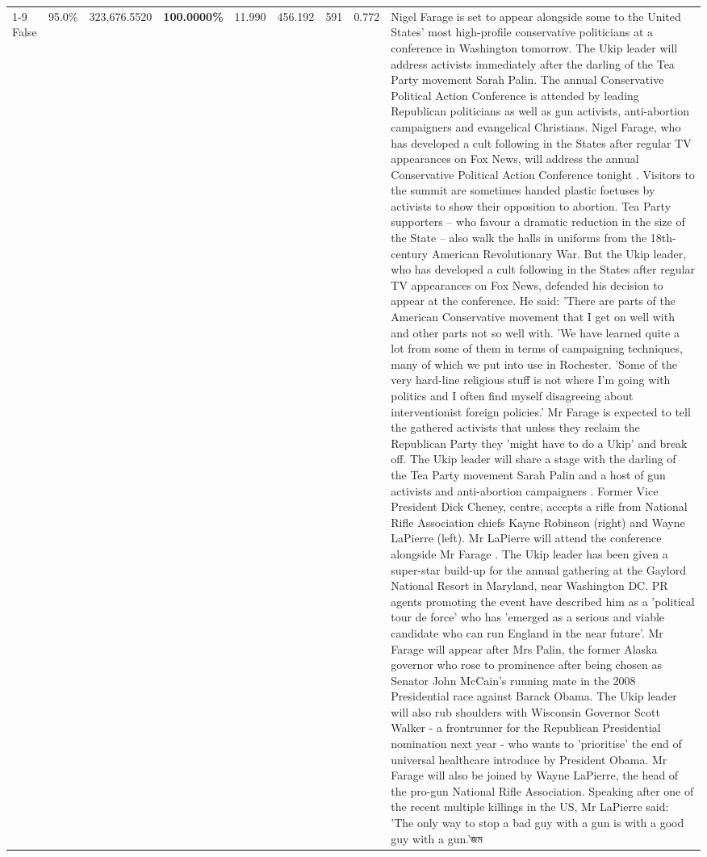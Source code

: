 \begin{table}[H]
\begin{tabular}{lllrlllll}
\cline{1-9}
False & 95.0\% & 323,676.5520 & \bfseries \color{red} 100.0000\% & 11.990 & 456.192 & 591 & 0.772 & Nigel Farage is set to appear alongside some to the United States' most high-profile conservative politicians at a conference in Washington tomorrow. The Ukip leader will address activists immediately after the darling of the Tea Party movement Sarah Palin. The annual Conservative Political Action Conference is attended by leading Republican politicians as well as gun activists, anti-abortion campaigners and evangelical Christians. Nigel Farage, who has developed a cult following in the States after regular TV appearances on Fox News, will address the annual Conservative Political Action Conference tonight . Visitors to the summit are sometimes handed plastic foetuses by activists to show their opposition to abortion. Tea Party supporters – who favour a dramatic reduction in the size of the State – also walk the halls in uniforms from the 18th-century American Revolutionary War. But the Ukip leader, who has developed a cult following in the States after regular TV appearances on Fox News, defended his decision to appear at the conference. He said: 'There are parts of the American Conservative movement that I get on well with and other parts not so well with. 'We have learned quite a lot from some of them in terms of campaigning techniques, many of which we put into use in Rochester. 'Some of the very hard-line religious stuff is not where I'm going with politics and I often find myself disagreeing about interventionist foreign policies.' Mr Farage is expected to tell the gathered activists that unless they reclaim the Republican Party they 'might have to do a Ukip' and break off. The Ukip leader will share a stage with the darling of the Tea Party movement Sarah Palin and a host of gun activists and anti-abortion campaigners . Former Vice President Dick Cheney, centre, accepts a rifle from National Rifle Association chiefs Kayne Robinson (right) and Wayne LaPierre (left). Mr LaPierre will attend the conference alongside Mr Farage . The Ukip leader has been given a super-star build-up for the annual gathering at the Gaylord National Resort in Maryland, near Washington DC. PR agents promoting the event have described him as a 'political tour de force' who has 'emerged as a serious and viable candidate who can run England in the near future'. Mr Farage will appear after Mrs Palin, the former Alaska governor who rose to prominence after being chosen as Senator John McCain's running mate in the 2008 Presidential race against Barack Obama. The Ukip leader will also rub shoulders with Wisconsin Governor Scott Walker - a frontrunner for the Republican Presidential nomination next year - who wants to 'prioritise' the end of universal healthcare introduce by President Obama. Mr Farage will also be joined by Wayne LaPierre, the head of the pro-gun National Rifle Association. Speaking after one of the recent multiple killings in the US, Mr LaPierre said: 'The only way to stop a bad guy with a gun is with a good guy with a gun.'জম \\

\end{tabular}
\end{table}
